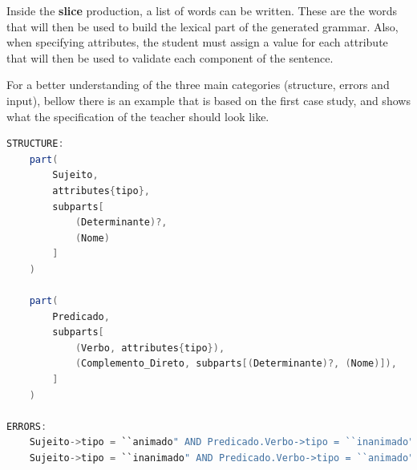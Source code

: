 Inside the \textbf{slice} production, a list of words can be written. These are the words that will then be used to build the lexical part of the generated grammar. Also, when specifying attributes, the student must assign a value for each attribute that will then be used to validate each component of the sentence.

For a better understanding of the three main categories (structure, errors and input), bellow there is an example that is based on the first case study, and shows what the specification of the teacher should look like.

\begin{center}
\begin{minipage}{13cm}
\begin{lstlisting}[language=java, basicstyle=\tiny, label={lst:metaStruct}, caption=Example of a possible sentence structure]
STRUCTURE:
    part(
        Sujeito, 
        attributes{tipo}, 
        subparts[
            (Determinante)?, 
            (Nome)
        ]
    )
    
    part(
        Predicado,
        subparts[
            (Verbo, attributes{tipo}),
            (Complemento_Direto, subparts[(Determinante)?, (Nome)]),
        ]
    )

ERRORS:
    Sujeito->tipo = ``animado" AND Predicado.Verbo->tipo = ``inanimado";
    Sujeito->tipo = ``inanimado" AND Predicado.Verbo->tipo = ``animado";
\end{lstlisting}
\end{minipage}
\end{center}

%

